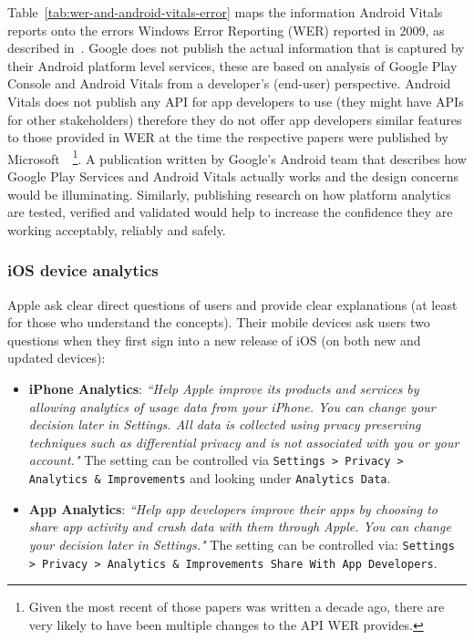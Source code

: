 Table~\ref{tab:wer-and-android-vitals-error} maps the information Android Vitals reports onto the errors Windows Error Reporting (WER) reported in 2009, as described in~\citep{kinshuman2009_debugging_in_the_very_large}. Google does not publish the actual information that is captured by their Android platform level services, these are based on analysis of Google Play Console and Android Vitals from a developer's (end-user) perspective. Android Vitals does not publish any API for app developers to use (they might have APIs for other stakeholders) therefore they do not offer app developers similar features to those provided in WER at the time the respective papers were published by Microsoft~\citep{kinshuman2009_debugging_in_the_very_large, kinshuman2011_debugging_in_the_very_large}~\footnote{Given the most recent of those papers was written a decade ago, there are very likely to have been multiple changes to the API WER provides.}. A publication written by Google's Android team that describes how Google Play Services and Android Vitals actually works and the design concerns would be illuminating. Similarly, publishing research on how platform analytics are tested, verified and validated would help to increase the confidence they are working acceptably, reliably and safely.

\subsubsection{iOS device analytics}
Apple ask clear direct questions of users and provide clear explanations (at least for those who understand the concepts). Their mobile devices ask users two questions when they first sign into a new release of iOS (on both new and updated devices):
\begin{itemize}
    \item \textbf{iPhone Analytics}: \emph{``Help Apple improve its products and services by allowing analytics of usage data from your iPhone. You can change your decision later in Settings. All data is collected using prvacy preserving techniques such as differential privacy and is not associated with you or your account."} The setting can be controlled via \texttt{Settings > Privacy > Analytics \& Improvements} and looking under \texttt{Analytics Data}.
    \item \textbf{App Analytics}: \emph{``Help app developers improve their apps by choosing to share app activity and crash data with them through Apple. You can change your decision later in Settings."} The setting can be controlled via: \texttt{Settings > Privacy > Analytics \& Improvements Share With App Developers}.
\end{itemize}


